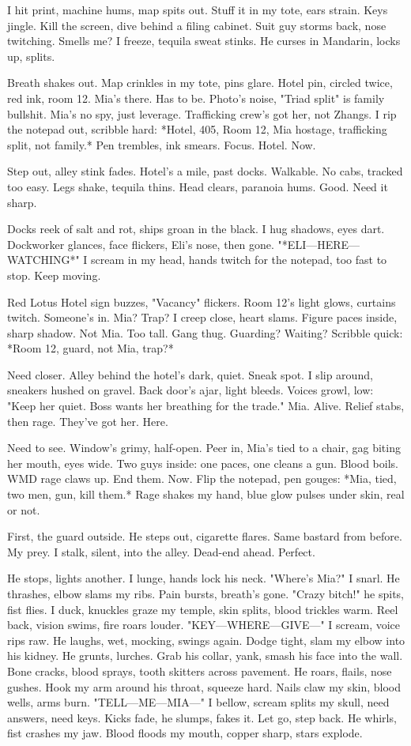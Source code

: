 \documentclass{article}
\begin{document}
I hit print, machine hums, map spits out. Stuff it in my tote, ears strain. Keys jingle. Kill the screen, dive behind a filing cabinet. Suit guy storms back, nose twitching. Smells me? I freeze, tequila sweat stinks. He curses in Mandarin, locks up, splits.

Breath shakes out. Map crinkles in my tote, pins glare. Hotel pin, circled twice, red ink, room 12. Mia's there. Has to be. Photo's noise, "Triad split" is family bullshit. Mia's no spy, just leverage. Trafficking crew's got her, not Zhangs. I rip the notepad out, scribble hard: *Hotel, 405, Room 12, Mia hostage, trafficking split, not family.* Pen trembles, ink smears. Focus. Hotel. Now.

Step out, alley stink fades. Hotel's a mile, past docks. Walkable. No cabs, tracked too easy. Legs shake, tequila thins. Head clears, paranoia hums. Good. Need it sharp.

Docks reek of salt and rot, ships groan in the black. I hug shadows, eyes dart. Dockworker glances, face flickers, Eli's nose, then gone. "*ELI—HERE—WATCHING*" I scream in my head, hands twitch for the notepad, too fast to stop. Keep moving.

Red Lotus Hotel sign buzzes, "Vacancy" flickers. Room 12's light glows, curtains twitch. Someone's in. Mia? Trap? I creep close, heart slams. Figure paces inside, sharp shadow. Not Mia. Too tall. Gang thug. Guarding? Waiting? Scribble quick: *Room 12, guard, not Mia, trap?*

Need closer. Alley behind the hotel's dark, quiet. Sneak spot. I slip around, sneakers hushed on gravel. Back door's ajar, light bleeds. Voices growl, low: "Keep her quiet. Boss wants her breathing for the trade." Mia. Alive. Relief stabs, then rage. They've got her. Here.

Need to see. Window's grimy, half-open. Peer in, Mia's tied to a chair, gag biting her mouth, eyes wide. Two guys inside: one paces, one cleans a gun. Blood boils. WMD rage claws up. End them. Now. Flip the notepad, pen gouges: *Mia, tied, two men, gun, kill them.* Rage shakes my hand, blue glow pulses under skin, real or not.

First, the guard outside. He steps out, cigarette flares. Same bastard from before. My prey. I stalk, silent, into the alley. Dead-end ahead. Perfect.

He stops, lights another. I lunge, hands lock his neck. "Where's Mia?" I snarl. He thrashes, elbow slams my ribs. Pain bursts, breath's gone. "Crazy bitch!" he spits, fist flies. I duck, knuckles graze my temple, skin splits, blood trickles warm. Reel back, vision swims, fire roars louder. "KEY—WHERE—GIVE—" I scream, voice rips raw. He laughs, wet, mocking, swings again. Dodge tight, slam my elbow into his kidney. He grunts, lurches. Grab his collar, yank, smash his face into the wall. Bone cracks, blood sprays, tooth skitters across pavement. He roars, flails, nose gushes. Hook my arm around his throat, squeeze hard. Nails claw my skin, blood wells, arms burn. "TELL—ME—MIA—" I bellow, scream splits my skull, need answers, need keys. Kicks fade, he slumps, fakes it. Let go, step back. He whirls, fist crashes my jaw. Blood floods my mouth, copper sharp, stars explode.
\end{document}
